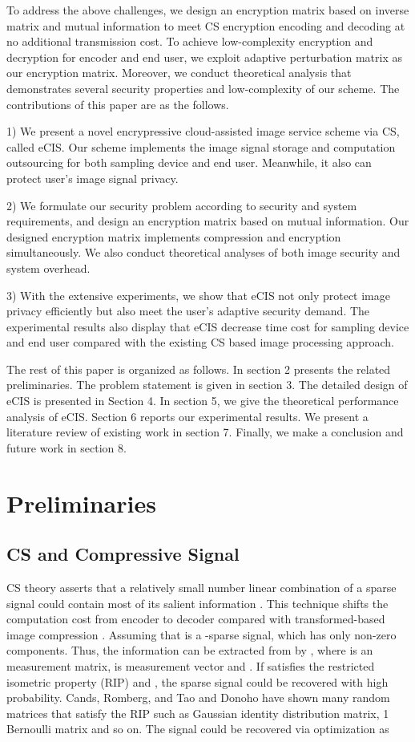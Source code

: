 \documentclass[conference]{IEEEtran}
\begin{document}
To address the above challenges, we design an encryption matrix based on inverse matrix and mutual information to meet CS encryption encoding and decoding at no additional transmission cost. To achieve low-complexity encryption and decryption for encoder and end user, we exploit adaptive perturbation matrix as our encryption matrix. Moreover, we conduct theoretical analysis that demonstrates several   security properties and low-complexity of our scheme.
The contributions of this paper are as the follows.

1) We present a novel encrypressive cloud-assisted image service scheme  via CS, called eCIS. Our scheme implements the image signal storage and computation outsourcing for both sampling device and end user. Meanwhile, it also can protect user's image signal privacy.

2) We formulate our security problem according to security and system requirements, and design an encryption matrix based on mutual information. Our designed encryption matrix implements compression and encryption simultaneously. We also conduct theoretical analyses of both image security and system overhead.


3) With the extensive experiments, we show that  eCIS not only protect image privacy efficiently but also meet the user's adaptive security demand. The experimental results also display that  eCIS decrease  time cost for sampling device and end user compared with the existing CS based image processing approach.


The rest of this paper is organized as follows.  In section 2 presents the related preliminaries. The problem statement is given in section 3. The detailed design of eCIS is presented in Section 4. In section 5, we give the theoretical performance analysis of eCIS. Section 6 reports our experimental results. We present a literature review of existing work in section 7. Finally, we make a conclusion and future work in section 8.


\section{Preliminaries}
\subsection{CS and Compressive Signal}
CS theory asserts that a relatively small number linear combination of a sparse signal could contain most of its salient information \cite{donoho2006compressed}. This technique shifts the computation cost from encoder to decoder compared with transformed-based image compression \cite{baraniuk2007compressive}.
Assuming that  is a -sparse signal, which has only   non-zero components. Thus, the information can be extracted from  by
,
where  is an  measurement matrix,  is measurement vector and .  If  satisfies the restricted isometric property (RIP) and {\small  } \cite{candes2005decoding}, the sparse signal  could be recovered with high probability.
Cands, Romberg, and Tao \cite{candes2006robust} and Donoho \cite{donoho2006compressed} have shown many random matrices that satisfy the RIP such as Gaussian identity distribution matrix, 1 Bernoulli matrix and so on. The signal  could be recovered via  optimization as
\end{document}
